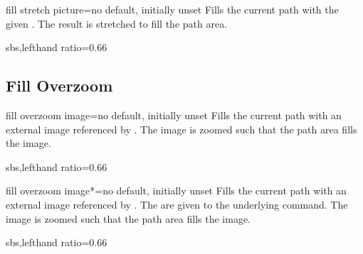 \begin{docTikzKey}{fill stretch picture}{=}{no default, initially unset}
  Fills the current path with the given .
  The result is stretched to fill the path area.
\begin{dispExample*}{sbs,lefthand ratio=0.66}
\end{dispExample*}
\end{docTikzKey}


\clearpage
\subsection{Fill Overzoom}
\begin{docTikzKey}{fill overzoom image}{=}{no default, initially unset}
  Fills the current path with an external image referenced by .
  The image is zoomed such that the path area fills the image.
\begin{dispExample*}{sbs,lefthand ratio=0.66}
\end{dispExample*}
\end{docTikzKey}


\begin{docTikzKey}{fill overzoom image*}{=}{no default, initially unset}
  Fills the current path with an external image referenced by .
  The  are given to the underlying  command.
  The image is zoomed such that the path area fills the image.
\begin{dispExample*}{sbs,lefthand ratio=0.66}
\end{dispExample*}
\end{docTikzKey}


